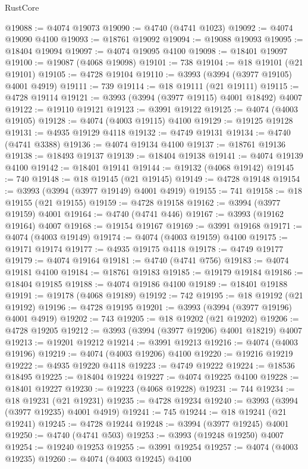\begin{lexlean}{RustCore}
\begin{coremodule}
@19088 := @4074 @19073
@19090 := @4740 (@4741 @1023)
@19092 := @4074 @19090 @4100
@19093 := @18761 @19092
@19094 := @19088 @19093
@19095 := @18404 @19094
@19097 := @4074 @19095 @4100
@19098 := @18401 @19097
@19100 := @19087 (@4068 @19098)
@19101 := 738
@19104 := @18 @19101 (@21 @19101)
@19105 := @4728 @19104
@19110 := @3993 (@3994 (@3977 @19105) @4001 @4919)
@19111 := 739
@19114 := @18 @19111 (@21 @19111)
@19115 := @4728 @19114
@19121 := @3993 (@3994 (@3977 @19115) @4001 @18492) @4007
@19122 := @19110 @19121
@19123 := @3991 @19122
@19125 := @4074 (@4003 @19105)
@19128 := @4074 (@4003 @19115) @4100
@19129 := @19125 @19128
@19131 := @4935 @19129 @4118
@19132 := @4749 @19131
@19134 := @4740 (@4741 @3388)
@19136 := @4074 @19134 @4100
@19137 := @18761 @19136
@19138 := @18493 @19137
@19139 := @18404 @19138
@19141 := @4074 @19139 @4100
@19142 := @18401 @19141
@19144 := @19132 (@4068 @19142)
@19145 := 740
@19148 := @18 @19145 (@21 @19145)
@19149 := @4728 @19148
@19154 := @3993 (@3994 (@3977 @19149) @4001 @4919)
@19155 := 741
@19158 := @18 @19155 (@21 @19155)
@19159 := @4728 @19158
@19162 := @3994 (@3977 @19159) @4001
@19164 := @4740 (@4741 @446)
@19167 := @3993 (@19162 @19164) @4007
@19168 := @19154 @19167
@19169 := @3991 @19168
@19171 := @4074 (@4003 @19149)
@19174 := @4074 (@4003 @19159) @4100
@19175 := @19171 @19174
@19177 := @4935 @19175 @4118
@19178 := @4749 @19177
@19179 := @4074 @19164
@19181 := @4740 (@4741 @756)
@19183 := @4074 @19181 @4100
@19184 := @18761 @19183
@19185 := @19179 @19184
@19186 := @18404 @19185
@19188 := @4074 @19186 @4100
@19189 := @18401 @19188
@19191 := @19178 (@4068 @19189)
@19192 := 742
@19195 := @18 @19192 (@21 @19192)
@19196 := @4728 @19195
@19201 := @3993 (@3994 (@3977 @19196) @4001 @4919)
@19202 := 743
@19205 := @18 @19202 (@21 @19202)
@19206 := @4728 @19205
@19212 := @3993 (@3994 (@3977 @19206) @4001 @18219) @4007
@19213 := @19201 @19212
@19214 := @3991 @19213
@19216 := @4074 (@4003 @19196)
@19219 := @4074 (@4003 @19206) @4100
@19220 := @19216 @19219
@19222 := @4935 @19220 @4118
@19223 := @4749 @19222
@19224 := @18536 @18495
@19225 := @18404 @19224
@19227 := @4074 @19225 @4100
@19228 := @18401 @19227
@19230 := @19223 (@4068 @19228)
@19231 := 744
@19234 := @18 @19231 (@21 @19231)
@19235 := @4728 @19234
@19240 := @3993 (@3994 (@3977 @19235) @4001 @4919)
@19241 := 745
@19244 := @18 @19241 (@21 @19241)
@19245 := @4728 @19244
@19248 := @3994 (@3977 @19245) @4001
@19250 := @4740 (@4741 @503)
@19253 := @3993 (@19248 @19250) @4007
@19254 := @19240 @19253
@19255 := @3991 @19254
@19257 := @4074 (@4003 @19235)
@19260 := @4074 (@4003 @19245) @4100

\end{coremodule}
\end{lexlean}
